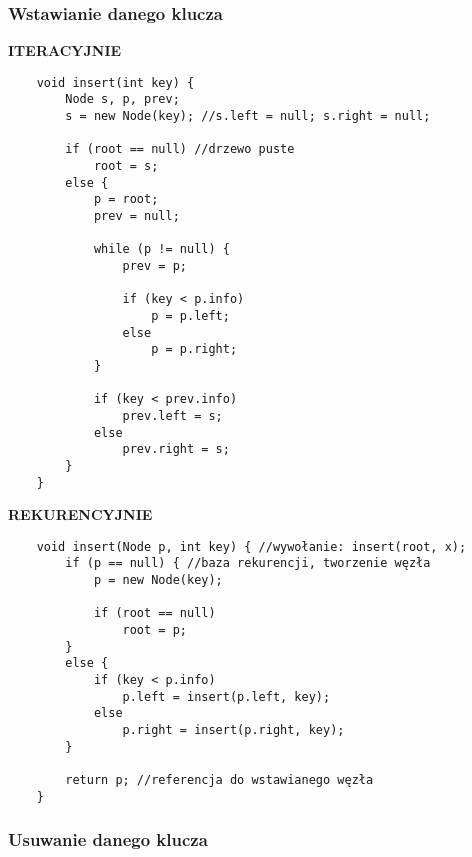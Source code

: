 \documentclass[algorytmy.tex]{subfiles}
\begin{document}
\pagebreak

\subsubsection{Wstawianie danego klucza}
\textbf{ITERACYJNIE}
\begin{verbatim}
    void insert(int key) {
        Node s, p, prev;
        s = new Node(key); //s.left = null; s.right = null;

        if (root == null) //drzewo puste
            root = s;
        else {
            p = root;
            prev = null;

            while (p != null) {
                prev = p;

                if (key < p.info)
                    p = p.left;
                else
                    p = p.right;
            }

            if (key < prev.info)
                prev.left = s;
            else
                prev.right = s;
        }
    }
\end{verbatim}


\textbf{REKURENCYJNIE}
\begin{verbatim}
    void insert(Node p, int key) { //wywołanie: insert(root, x);
        if (p == null) { //baza rekurencji, tworzenie węzła
            p = new Node(key);

            if (root == null)
                root = p;
        }
        else {
            if (key < p.info)
                p.left = insert(p.left, key);
            else
                p.right = insert(p.right, key);
        }

        return p; //referencja do wstawianego węzła
    }
\end{verbatim}

\pagebreak

\subsubsection{Usuwanie danego klucza}
\end{document}
